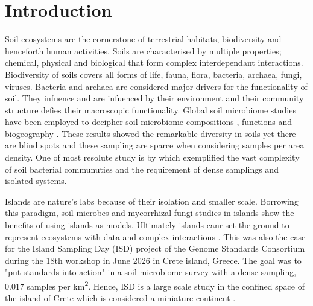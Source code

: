 \documentclass[unnumsec,webpdf,contemporary,large]{oup-authoring-template}%
\theoremstyle{thmstyleone}%
\theoremstyle{thmstyletwo}%
\theoremstyle{thmstylethree}%
\begin{document}


\maketitle

\section{Introduction}\label{intro}

Soil ecosystems are the cornerstone of terrestrial habitats, biodiversity and henceforth human activities.
Soils are characterised by multiple properties; chemical, physical and biological that 
form complex interdependant interactions. Biodiversity of soils covers
all forms of life, fauna, flora, bacteria, archaea, fungi, viruses. 
Bacteria and archaea are considered major drivers for the functionality of soil.
They infuence and are infuenced by their environment and their community structure 
defies their macroscopic functionality.
Global soil microbiome studies have been employed to decipher soil microbiome
compositions \cite{thompson2017a-communal, Delgado-Baquerizo2018, Labouyrie2023},
functions \cite{Bahram2018} and biogeography \cite{Martiny2006, Guerra2020}.
These results showed the remarkable diversity in soils yet there are blind spots \cite{Guerra2020}
and these sampling are sparce when considering samples per area density. One of most resolute
study is by \cite{Karimi2020} which exemplified the 
vast complexity of soil bacterial communuties and the requirement of dense samplings and isolated systems.

Islands are nature's labs \cite{Whittaker2017} because of their isolation and smaller scale.
Borrowing this paradigm, soil microbes \cite{Li2020} and mycorrhizal fungi \cite{Delavaux2021} studies
in islands show the benefits of using islands as models. Ultimately islands canr
set the ground to represent ecosystems with data and complex interactions \cite{Davies2016}.
This was also the case for the Island Sampling Day (ISD) project \cite{holm2024}
of the Genome Standards Consortium \cite{Field2011}
during the 18th workshop in June 2026 in Crete island, Greece. The goal was to "put standards into action"
in a soil microbiome survey with a dense sampling, 0.017 samples per km\textsuperscript{2}.
Hence, ISD is a large scale study in the confined space of the island of Crete which 
is considered a miniature continent \cite{Vogiatzakis2008_crete}.
\end{document}
